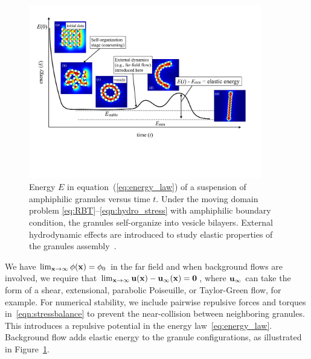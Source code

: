 \begin{figure} 
  \includegraphics[width=4in]{figures/Background/coarsening.pdf}
  \vspace{-25pt}
  \caption{\label{fig:coarsening} \footnotesize Energy $E$ in
  equation~(\ref{eq:energy_law}) of a suspension of amphiphilic granules
  versus time $t$. Under the moving domain problem
  \eqref{eq:RBT}--\eqref{eqn:hydro_stress} with amphiphilic boundary
  condition, the granules self-organize into vesicle bilayers. External
  hydrodynamic effects are introduced to study elastic properties of
  the granules assembly~\cite{Fu2018_SIAM,FuQuRyYo22}.}
\end{figure}

We have $\lim_{\mathbf{x} \to \infty} \phi(\mathbf{x}) = \phi_0$ in the far field and
when background flows are involved, we require that $\lim_{\mathbf{x} \to
\infty} \mathbf{u}(\mathbf{x}) - \mathbf{u}_{\infty}(\mathbf{x}) = \mathbf{0}$, where $\mathbf{u}_{\infty}$
can take the form
of a shear, extensional, parabolic Poiseuille, or Taylor-Green flow, for
example. For numerical stability, we include pairwise repulsive forces
and torques in~\eqref{eqn:stressbalance} to prevent the near-collision
between neighboring granules. This introduces a repulsive potential in
the energy law~\eqref{eq:energy_law}. Background flow adds elastic
energy to the granule configurations, as illustrated in
Figure~\ref{fig:coarsening}.

